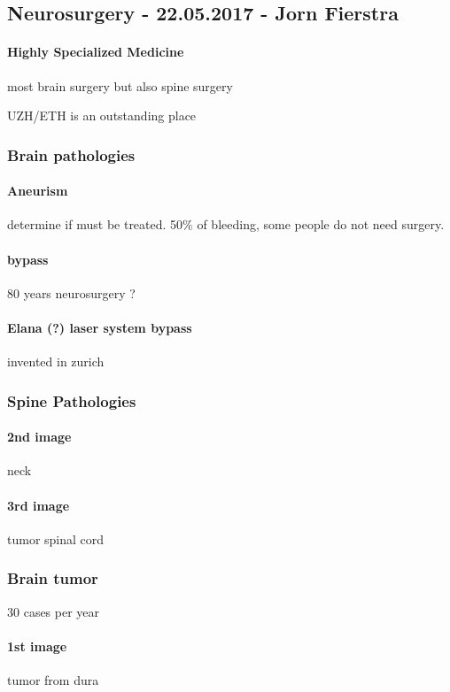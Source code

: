 \documentclass[12pt,article,oneside,a4paper]{memoir}
\begin{document}
\subsection{Neurosurgery - 22.05.2017 - Jorn Fierstra}
\paragraph{Highly Specialized Medicine} most brain surgery but also spine surgery

UZH/ETH is an outstanding place

\subsubsection{Brain pathologies}
\paragraph{Aneurism} determine if must be treated. 50\% of bleeding, some people do not need surgery.
\paragraph{bypass} 80 years neurosurgery ?
\paragraph{Elana (?) laser system bypass} invented in zurich

\subsubsection{Spine Pathologies}
\paragraph{2nd image} neck
\paragraph{3rd image} tumor spinal cord

\subsubsection{Brain tumor} 30 cases per year
\paragraph{1st image} tumor from dura
\end{document}
